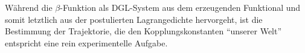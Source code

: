     Während die $\beta$-Funktion als DGL-System aus dem erzeugenden Funktional 
    und somit letztlich aus der postulierten Lagrangedichte hervorgeht, ist die 
    Bestimmung der Trajektorie, die 
    den Kopplungskonstanten "`unserer Welt"' entspricht eine rein 
    experimentelle Aufgabe.  
  
 
    

  
    



      


  
  
  
  
